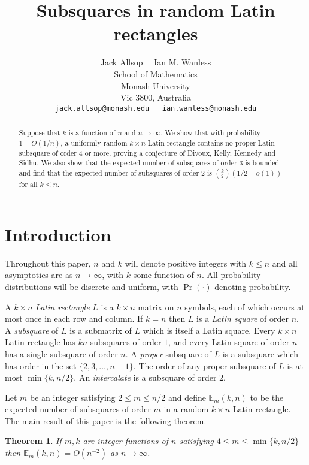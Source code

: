 \documentclass[12pt]{article}
\title{Subsquares in random Latin rectangles}
\author{Jack Allsop \ \ Ian M. Wanless\\
	\small School of Mathematics\\[-0.5ex]
	\small Monash University\\[-0.5ex]
	\small Vic 3800, Australia\\
	\small\tt jack.allsop@monash.edu \ \ ian.wanless@monash.edu}
\date{}
\newtheorem{thm}{Theorem}[section]
\theoremstyle{definition}
\numberwithin{equation}{section}
\renewcommand{\leq}{\leqslant}
\renewcommand{\le}{\leqslant}
\newcommand{\E}{\mathbb{E}}
\begin{document}
	
	\maketitle
	
	\begin{abstract}
	  Suppose that $k$ is a function of $n$ and $n\to\infty$.  We show
	  that with probability $1-O(1/n)$, a uniformly random $k\times n$
	  Latin rectangle contains no proper Latin subsquare of order $4$ or
	  more, proving a conjecture of Divoux, Kelly, Kennedy and Sidhu. We
	  also show that the expected number of subsquares of order 3 is
	  bounded and find that the expected number of subsquares of order
          2 is $\binom k2(1/2+o(1))$ for all $k\le n$.
	\end{abstract}
	
	\section{Introduction}\label{s:intro}
	
	Throughout this paper, $n$ and $k$ will denote positive integers with $k \leq n$ and all asymptotics are as $n \to \infty$, with $k$ some function of $n$. All probability distributions will be discrete and uniform, with $\Pr(\cdot)$ denoting probability.
	
	A $k \times n$ \emph{Latin rectangle} $L$ is a $k \times n$ matrix on $n$ symbols, each of which occurs at most once in each row and column. If $k=n$ then $L$ is a \emph{Latin square} of order $n$. A \emph{subsquare} of $L$ is a submatrix of $L$ which is itself a Latin square. Every $k \times n$ Latin rectangle has $kn$ subsquares of order $1$, and every Latin square of order $n$ has a single subsquare of order $n$. A \emph{proper} subsquare of $L$ is a subsquare which has order in the set $\{2, 3, \ldots, n-1\}$. The order of any proper subsquare of $L$ is at most $\min\{k, n/2\}$. An \emph{intercalate} is a subsquare of order $2$. 
	
	Let $m$ be an integer satisfying $2 \leq m \leq n/2$ and
	define $\E_m(k,n)$ to be the expected number of subsquares of
	order $m$ in a random $k \times n$ Latin rectangle.  The main
	result of this paper is the following theorem.
	
	\begin{thm}\label{t:main}
		If $m,k$ are integer functions of $n$ satisfying $4\le
		m\le\min\{k,n/2\}$ then $\E_m(k,n)=O(n^{-2})$ as $n\to\infty$.
	\end{thm}
	
\end{document}
